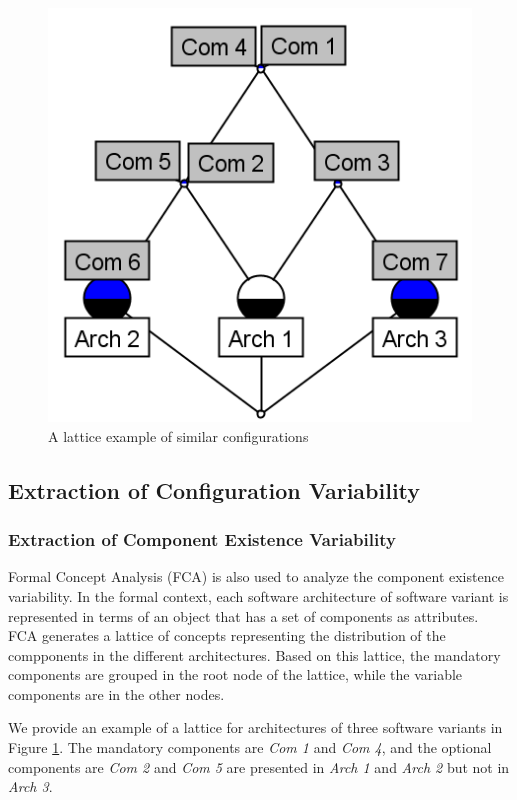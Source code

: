\documentclass[graybox]{svmult}
\begin{document}
\begin{figure}[h]
\centering
\includegraphics[scale=0.55]{figs/FCA_Arhc_Exam.png}
\caption{A lattice example of similar configurations}
\label{fig:lattArchExam}
\end{figure}



\subsection{Extraction of Configuration Variability}

\subsubsection{Extraction of Component Existence Variability}

Formal Concept Analysis (FCA) is also used to analyze the component existence variability. In the formal context, each software architecture of software variant is represented in terms of an object that has a set of components as attributes. FCA generates a lattice of concepts representing the distribution of the compponents in the different architectures. Based on this lattice, the mandatory components are grouped in the root node of the lattice, while the variable components are in the other nodes.

We provide an example of a lattice for architectures of three software variants in Figure \ref{fig:lattArchExam}. The mandatory components are \textit{Com 1} and \textit{Com 4}, and the optional components are \textit{Com 2} and \textit{Com 5} are presented in \textit{Arch 1} and \textit{Arch 2} but not in \textit{Arch 3}.
\end{document}
